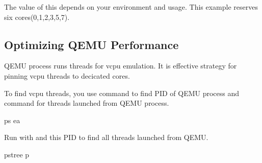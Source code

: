 \documentclass[a4paper,11pt,openany,oneside,english]{sphinxmanual}
\begin{document}
\begin{sphinxVerbatim}[commandchars=\\\{\},formatcom=\footnotesize]
\end{sphinxVerbatim}

The value of this  depends on your environment and usage.
This example reserves six cores(0,1,2,3,5,7).


\subsection{Optimizing QEMU Performance}
\label{\detokenize{gsg/performance_opt:optimizing-qemu-performance}}
QEMU process runs threads for vcpu emulation. It is effective strategy
for pinning vcpu threads to decicated cores.

To find vcpu threads, you use  command to find PID of QEMU process
and  command for threads launched from QEMU process.

\begin{sphinxVerbatim}[commandchars=\\\{\},formatcom=\footnotesize]
 ps ea
\end{sphinxVerbatim}

Run  with  and this PID to find all threads launched from QEMU.

\begin{sphinxVerbatim}[commandchars=\\\{\},formatcom=\footnotesize]
 pstree \PYGZhy{}p 
\end{sphinxVerbatim}
\end{document}
